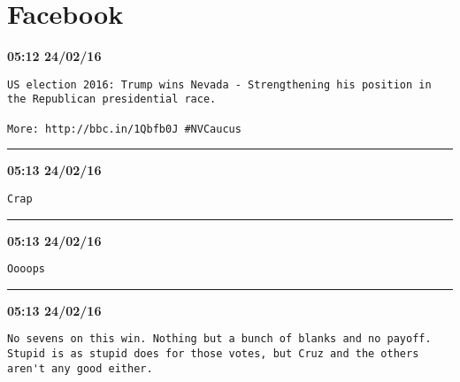 \section{Facebook}
\label{threads:facebook}

\begin{adjustwidth}{0cm}{0cm}
\footnotesize \textbf{05:12 24/02/16}

\begin{lstlisting}[breaklines, breakatwhitespace, basicstyle=\small, frame=leftline]
US election 2016: Trump wins Nevada - Strengthening his position in the Republican presidential race.

More: http://bbc.in/1Qbfb0J #NVCaucus
\end{lstlisting}
\end{adjustwidth}

\hrule%

\begin{adjustwidth}{0cm}{0cm}
\footnotesize \textbf{05:13 24/02/16}

\begin{lstlisting}[breaklines, breakatwhitespace, basicstyle=\small, frame=leftline]
Crap
\end{lstlisting}
\end{adjustwidth}

\hrule%

\begin{adjustwidth}{0cm}{0cm}
\footnotesize \textbf{05:13 24/02/16}

\begin{lstlisting}[breaklines, breakatwhitespace, basicstyle=\small, frame=leftline]
Oooops
\end{lstlisting}
\end{adjustwidth}

\hrule%

\begin{adjustwidth}{0cm}{0cm}
\footnotesize \textbf{05:13 24/02/16}

\begin{lstlisting}[breaklines, breakatwhitespace, basicstyle=\small, frame=leftline]
No sevens on this win. Nothing but a bunch of blanks and no payoff.  Stupid is as stupid does for those votes, but Cruz and the others aren't any good either.
\end{lstlisting}
\end{adjustwidth}

